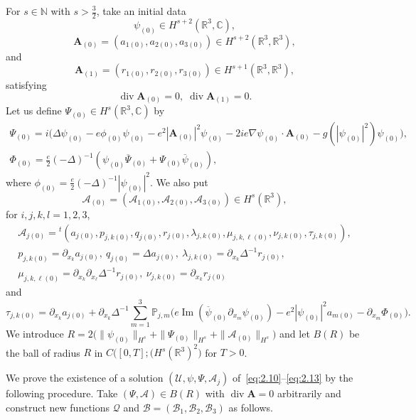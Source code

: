 \documentclass[AHL,Unicode,longabstracts]{cedram}
\newcommand{\BA}{\mathbf{A}}
\newcommand{\R}{\mathbb{R}}
\newcommand{\Com}{\mathbb{C}}
\newcommand{\N}{\mathbb{N}}
\DeclareMathOperator{\IM}{Im}
\DeclareMathOperator{\Div}{div}
\begin{document}
For $s \in \N$ with $s > \frac{3}{2}$, take an initial data
\[
\psi_{(0)} \in H^{s+2}(\R^3,\Com),
\]
\[
\BA_{(0)}=(a_{1(0)}, a_{2(0)}, a_{3(0)}) \in H^{s+2}(\R^3,\R^3),
\]
and
\[
\BA_{(1)}=(r_{1(0)},r_{2(0)},r_{3(0)}) \in H^{s+1}(\R^3,\R^3),
\]
satisfying
\[
\Div \BA_{(0)}=0, \;\Div \BA_{(1)}=0.
\]
Let us define $\Psi_{(0)} \in H^s(\R^3,\Com)$ by
\begin{equation}\label{Psi0}
\begin{gathered}
\Psi_{(0)}= i\big(\Delta \psi_{(0)} -e\phi_{(0)}\psi_{(0)}-e^2|\BA_{(0)}|^2 \psi_{(0)} -2ie\nabla \psi_{(0)}\cdot \BA_{(0)}-g(|\psi_{(0)}|^2)\psi_{(0)}\big),
\\
\Phi_{(0)}=\frac{e}{2}(-\Delta)^{-1} (\psi_{(0)} \overline{\Psi}_{(0)}
+\Psi_{(0)} \overline{\psi}_{(0)}),
\end{gathered}
\end{equation}
where $\phi_{(0)}= \frac{e}{2}(-\Delta)^{-1} | \psi_{(0)}|^2$.
We also put
\[
\mathcal{A}_{(0)}=(\mathcal{A}_{1(0)}, \mathcal{A}_{2(0)}, \mathcal{A}_{3(0)}) \in H^s(\R^3),
\]
for $i,j,k,l=1,2,3$,
\begin{gather*}
\mathcal{A}_{j(0)}= {}^t (a_{j(0)}, p_{j,k(0)}, q_{j(0)}, r_{j(0)},
\lambda_{j,k(0)}, \mu_{j,k,\ell(0)}, \nu_{j,k(0)}, \tau_{j,k(0)}),
\\
p_{j,k(0)}=\partial_{x_k} a_{j(0)}, \ q_{j(0)}=\Delta a_{j(0)}, \
\lambda_{j,k(0)}=\partial_{x_k} \Delta^{-1} r_{j(0)},
\\
\mu_{j,k,\ell(0)}= \partial_{x_k} \partial_{x_{\ell}} \Delta^{-1} r_{j(0)}, \
\nu_{j,k(0)}=\partial_{x_k} r_{j(0)}
\end{gather*}
and
\[
\tau_{j,k(0)}= \partial_{x_k} a_{j(0)} +\partial_{x_k} \Delta^{-1} \sum_{m=1}^3 \mathbb{P}_{j,m}
\big(e \IM (\overline{\psi}_{(0)}\partial_{x_m} \psi_{(0)}) -e^2 | \psi_{(0)}|^2 a_{m(0)}
- \partial_{x_m} \Phi_{(0)} \big).
\]
We introduce $R=2\big(\| \psi_{(0)} \|_{H^s}+\| \Psi_{(0)} \|_{H^s}+\| \mathcal{A}_{(0)} \|_{H^s}\big)$ and let $B(R)$ be the ball of radius $R$ in $C\big([0,T];(H^s(\R^3)^2\big)$ for $T>0$.

We prove the existence of a solution $(\mathcal{U}, \psi, \Psi, \mathcal{A}_j)$ of~\eqref{eq:2.10}--\eqref{eq:2.13} by the following procedure. Take $(\Psi, \mathcal{A}) \in B(R)$ with $\Div \BA=0$ arbitrarily and construct new functions $\mathcal{Q}$ and $\mathcal{B}=(\mathcal{B}_1,\mathcal{B}_2,\mathcal{B}_3)$ as follows.
\end{document}

